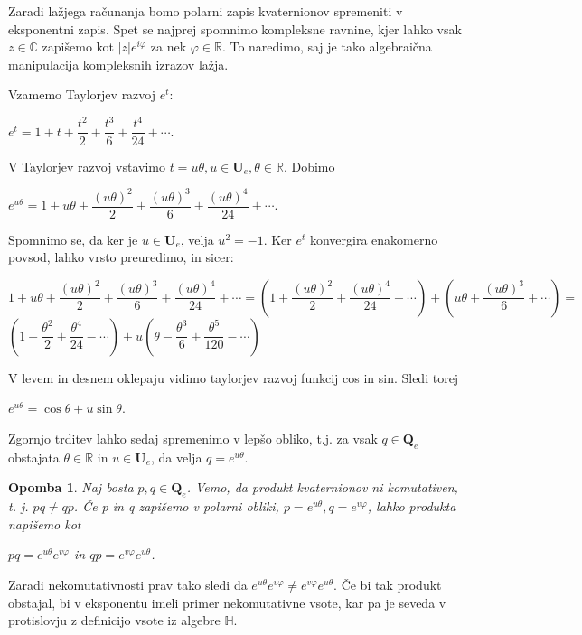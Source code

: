 \documentclass[a4paper,12pt]{article}
\def\R{\mathbb{R}} %
\def\C{\mathbb{C}} %
\def\H{\mathbb{H}} %
\def\Qe{\textbf{Q}_{e}} %
\def\Ue{\textbf{U}_{e}} %
\newtheorem{opomba}{Opomba}
\begin{document}
Zaradi lažjega računanja bomo polarni zapis kvaternionov spremeniti v eksponentni zapis. Spet se najprej spomnimo kompleksne ravnine, kjer lahko
vsak $z \in \C$ zapišemo kot $|z|e^{i\varphi}$ za nek $\varphi \in \R$. To naredimo, saj je tako
algebraična manipulacija kompleksnih izrazov lažja.

Vzamemo Taylorjev razvoj $e^t$:
\begin{center}
   $e^t = 1+t+\dfrac{t^2}{2}+\dfrac{t^3}{6}+\dfrac{t^4}{24} + \cdots$.
\end{center}
V Taylorjev razvoj vstavimo $t = u\theta, u \in \Ue, \theta \in \R$. Dobimo %
\begin{center}
   $e^{u\theta} = 1 + u\theta + \dfrac{(u\theta)^2}{2} + \dfrac{(u\theta)^3}{6} + \dfrac{(u\theta)^4}{24} + \cdots$.
\end{center}
Spomnimo se, da ker je $u \in \Ue$, velja $u^2=-1$. Ker $e^t$ konvergira enakomerno povsod, lahko vrsto preuredimo, in sicer:
\begin{center}
   $1 + u\theta + \dfrac{(u\theta)^2}{2} + \dfrac{(u\theta)^3}{6} + \dfrac{(u\theta)^4}{24} + \cdots = (1 + \dfrac{(u\theta)^2}{2} + \dfrac{(u\theta)^4}{24}+ \cdots) + (u\theta + \dfrac{(u\theta)^3}{6} + \cdots) = $
   $(1-\dfrac{\theta^2}{2}+\dfrac{\theta^4}{24}- \cdots) + u(\theta - \dfrac{\theta^3}{6} +\dfrac{\theta^5}{120} - \cdots)$
\end{center}
V levem in desnem oklepaju vidimo taylorjev razvoj funkcij cos in sin. Sledi torej
\begin{center}
   $e^{u\theta} = \cos\theta  + u\sin\theta$.
\end{center}
Zgornjo trditev lahko sedaj spremenimo v lepšo obliko, t.j. za vsak $q \in \Qe$ obstajata
$\theta \in \R$ in $u \in \Ue$, da velja $q =  e^{u\theta}$.

\begin{opomba} 
Naj bosta $p,q \in \Qe$. Vemo, da produkt kvaternionov ni komutativen, t. j. $p q \neq q p$. Če p in q zapišemo v polarni obliki, 
$p = e^{u\theta}, q = e^{v\varphi}$, lahko produkta napišemo kot
\begin{center}
   $p q = e^{u\theta} e^{v\varphi}$ in $q p = e^{v\varphi}e^{u\theta}$.
\end{center}
\end{opomba}
Zaradi nekomutativnosti prav tako sledi da $e^{u\theta} e^{v\varphi} \neq e^{v\varphi}e^{u\theta}$. Če bi tak produkt obstajal, bi v eksponentu imeli primer nekomutativne vsote,
kar pa je seveda v protislovju z definicijo vsote iz algebre $\H$.
\end{document}
